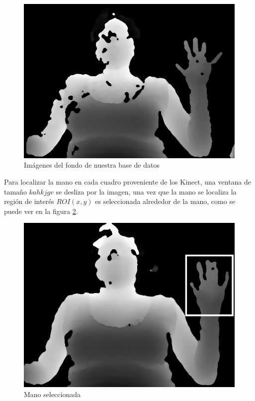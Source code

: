 \begin{figure}[h!]
\begin{center}
\includegraphics[scale=.5]{./Figures/166_W13.png}
\end{center}
\caption{Imágenes del fondo de nuestra base de datos}
\label{fig:ImagenFondo}
\end{figure}  

Para localizar la mano en cada cuadro proveniente de los Kinect, una ventana de tamaño $kahkjgv$ se desliza por la imagen, una vez que la mano se localiza la región de interés $ROI(x,y)$ es seleccionada alrededor de la mano, como se puede ver en la figura \ref{fig:Roi}.

\begin{figure}[h!]
\begin{center}
\includegraphics[scale=.5]{./Figures/roi.png}
\end{center}
\caption{Mano seleccionada}
\label{fig:Roi}
\end{figure}  

